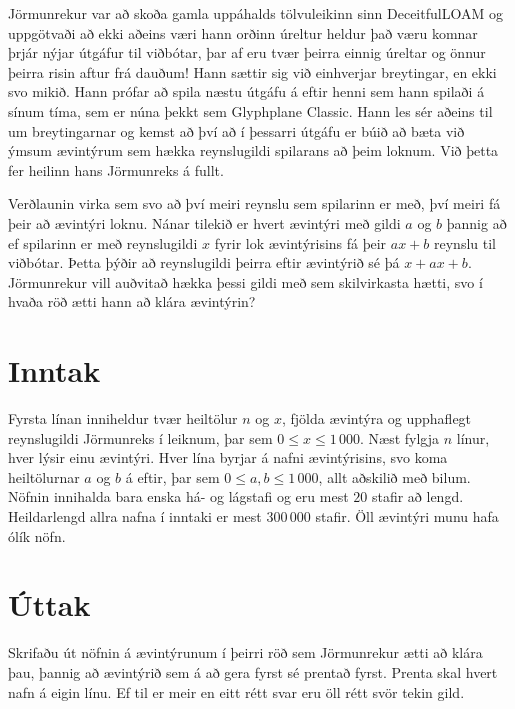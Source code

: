 
Jörmunrekur var að skoða gamla uppáhalds tölvuleikinn sinn DeceitfulLOAM og uppgötvaði að ekki aðeins væri hann orðinn úreltur
heldur það væru komnar þrjár nýjar útgáfur til viðbótar, þar af eru tvær þeirra einnig úreltar og önnur þeirra risin aftur frá dauðum!
Hann sættir sig við einhverjar breytingar, en ekki svo mikið. Hann prófar að spila næstu útgáfu á eftir henni sem hann spilaði á
sínum tíma, sem er núna þekkt sem Glyphplane Classic. Hann les sér aðeins til um breytingarnar og kemst að því að í þessarri útgáfu
er búið að bæta við ýmsum ævintýrum sem hækka reynslugildi spilarans að þeim loknum. Við þetta fer heilinn hans Jörmunreks á fullt.

Verðlaunin virka sem svo að því meiri reynslu sem spilarinn er með, því meiri fá þeir að ævintýri loknu. Nánar tilekið er hvert
ævintýri með gildi $a$ og $b$ þannig að ef spilarinn er með reynslugildi $x$ fyrir lok ævintýrisins fá þeir $ax + b$ reynslu
til viðbótar. 
Þetta þýðir að reynslugildi þeirra eftir ævintýrið sé þá $x + ax + b$.
Jörmunrekur vill auðvitað hækka þessi gildi með sem skilvirkasta hætti, svo í hvaða röð ætti hann að klára ævintýrin?

\section*{Inntak}
Fyrsta línan inniheldur tvær heiltölur $n$ og $x$, fjölda ævintýra og upphaflegt reynslugildi Jörmunreks í leiknum, þar sem $0 \leq x \leq 1\,000$.
Næst fylgja $n$ línur, hver lýsir einu ævintýri. Hver lína byrjar á nafni ævintýrisins, svo koma heiltölurnar $a$ og $b$ á eftir, þar sem $0 \leq a, b \leq 1\,000$, allt
aðskilið með bilum. Nöfnin innihalda bara enska há- og lágstafi og eru mest $20$ stafir að lengd. Heildarlengd allra nafna í inntaki er
mest $300\,000$ stafir. Öll ævintýri munu hafa ólík nöfn.

\section*{Úttak}
Skrifaðu út nöfnin á ævintýrunum í þeirri röð sem Jörmunrekur ætti að klára þau, þannig að ævintýrið sem á að gera fyrst sé prentað fyrst.
Prenta skal hvert nafn á eigin línu. Ef til er meir en eitt rétt svar eru öll rétt svör tekin gild.

